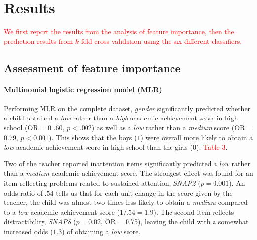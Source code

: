 \documentclass[10pt,letterpaper]{article}
\begin{document}
{{\vspace{5mm}


\section*{Results}

\textcolor{red}{We first report the results from the analysis of feature importance, then the prediction results from $k$-fold cross validation using the six different classifiers.}

\subsection*{Assessment of feature importance} 


\paragraph{Multinomial logistic regression model (MLR)}


Performing MLR on the complete dataset, {\it gender} significantly predicted whether a child obtained a {\it low} rather than a {\it high} academic achievement score in high school (OR = 0 .60, $p < .002$) as well as a {\it low} rather than a {\it medium} score (OR = $0.79$, $p < 0.001$). This shows that the boys ($1$) were overall more likely to obtain a {\it low} academic achievement score in high school than the girls ($0$). \textcolor{red}{Table 3}. 

Two of the teacher reported inattention items significantly predicted a {\it low} rather than a {\it medium} academic achievement score. The strongest effect was found for an item reflecting problems related to sustained attention, {\it SNAP2} ($p = 0.001$). An odds ratio of $.54$ tells us that for each unit change in the score given by the teacher, the child was almost two times less likely to obtain a {\it medium} compared to a {\it low} academic achievement score ($1/.54 = 1.9$). The second item reflects distractibility, {\it SNAP8} ($p = 0.02$, OR = 0.75), leaving the child with a somewhat increased odds ($1.3$) of obtaining a {\it low} score.  


}}
\end{document}
